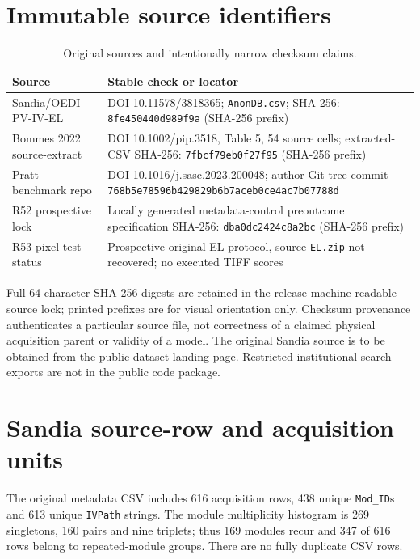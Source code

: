 \documentclass[10pt,a4paper]{article}
\begin{document}
\section{Immutable source identifiers}
\begin{table}[ht]\centering\footnotesize
\caption{Original sources and intentionally narrow checksum claims.}
\begin{tabularx}{\linewidth}{@{}p{2.6cm}X@{}}\toprule
Source & Stable check or locator \\\midrule
Sandia/OEDI PV-IV-EL & DOI 10.11578/3818365; \texttt{AnonDB.csv}; SHA-256: \texttt{8fe450440d989f9a} (SHA-256 prefix) \\
Bommes 2022 source-extract & DOI 10.1002/pip.3518, Table 5, 54 source cells; extracted-CSV SHA-256: \texttt{7fbcf79eb0f27f95} (SHA-256 prefix) \\
Pratt benchmark repo & DOI 10.1016/j.sasc.2023.200048; author Git tree commit \texttt{768b5e78596b429829b6b7aceb0ce4ac7b07788d} \\
R52 prospective lock & Locally generated metadata-control preoutcome specification SHA-256: \texttt{dba0dc2424c8a2bc} (SHA-256 prefix) \\
R53 pixel-test status & Prospective original-EL protocol, source \texttt{EL.zip} not recovered; no executed TIFF scores \\
\bottomrule\end{tabularx}
\end{table}

Full 64-character SHA-256 digests are retained in the release machine-readable source lock; printed prefixes are for visual orientation only. Checksum provenance authenticates a particular source file, not correctness of a claimed physical acquisition parent or validity of a model. The original Sandia source is to be obtained from the public dataset landing page. Restricted institutional search exports are not in the public code package.

\section{Sandia source-row and acquisition units}
The original metadata CSV includes 616 acquisition rows, 438 unique \texttt{Mod\_ID}s and 613 unique \texttt{IVPath} strings. The module multiplicity histogram is 269 singletons, 160 pairs and nine triplets; thus 169 modules recur and 347 of 616 rows belong to repeated-module groups. There are no fully duplicate CSV rows.
\end{document}
